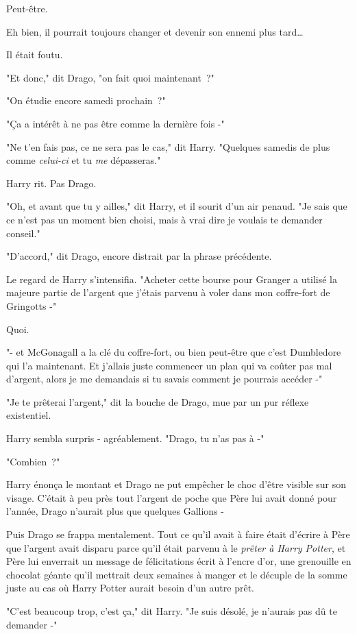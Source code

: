 Peut-être.

Eh bien, il pourrait toujours changer et devenir son ennemi plus tard…

Il était foutu.

"Et donc," dit Drago, "on fait quoi maintenant~?"

"On étudie encore samedi prochain~?"

"Ça a intérêt à ne pas être comme la dernière fois -"

"Ne t'en fais pas, ce ne sera pas le cas," dit Harry. "Quelques samedis de plus comme \emph{celui-ci} et tu \emph{me} dépasseras."

Harry rit. Pas Drago.

"Oh, et avant que tu y ailles," dit Harry, et il sourit d'un air penaud. "Je sais que ce n'est pas un moment bien choisi, mais à vrai dire je voulais te demander conseil."

"D'accord," dit Drago, encore distrait par la phrase précédente.

Le regard de Harry s'intensifia. "Acheter cette bourse pour Granger a utilisé la majeure partie de l'argent que j'étais parvenu à voler dans mon coffre-fort de Gringotts -"

Quoi.

"- et McGonagall a la clé du coffre-fort, ou bien peut-être que c'est Dumbledore qui l'a maintenant. Et j'allais juste commencer un plan qui va coûter pas mal d'argent, alors je me demandais si tu savais comment je pourrais accéder -"

"Je te prêterai l'argent," dit la bouche de Drago, mue par un pur réflexe existentiel.

Harry sembla surpris - agréablement. "Drago, tu n'as pas à -"

"Combien~?"

Harry énonça le montant et Drago ne put empêcher le choc d'être visible sur son visage. C'était à peu près tout l'argent de poche que Père lui avait donné pour l'année, Drago n'aurait plus que quelques Gallions -

Puis Drago se frappa mentalement. Tout ce qu'il avait à faire était d'écrire à Père que l'argent avait disparu parce qu'il était parvenu à le \emph{prêter à Harry Potter}, et Père lui enverrait un message de félicitations écrit à l'encre d'or, une grenouille en chocolat géante qu'il mettrait deux semaines à manger et le décuple de la somme juste au cas où Harry Potter aurait besoin d'un autre prêt.

"C'est beaucoup trop, c'est ça," dit Harry. "Je suis désolé, je n'aurais pas dû te demander -"

